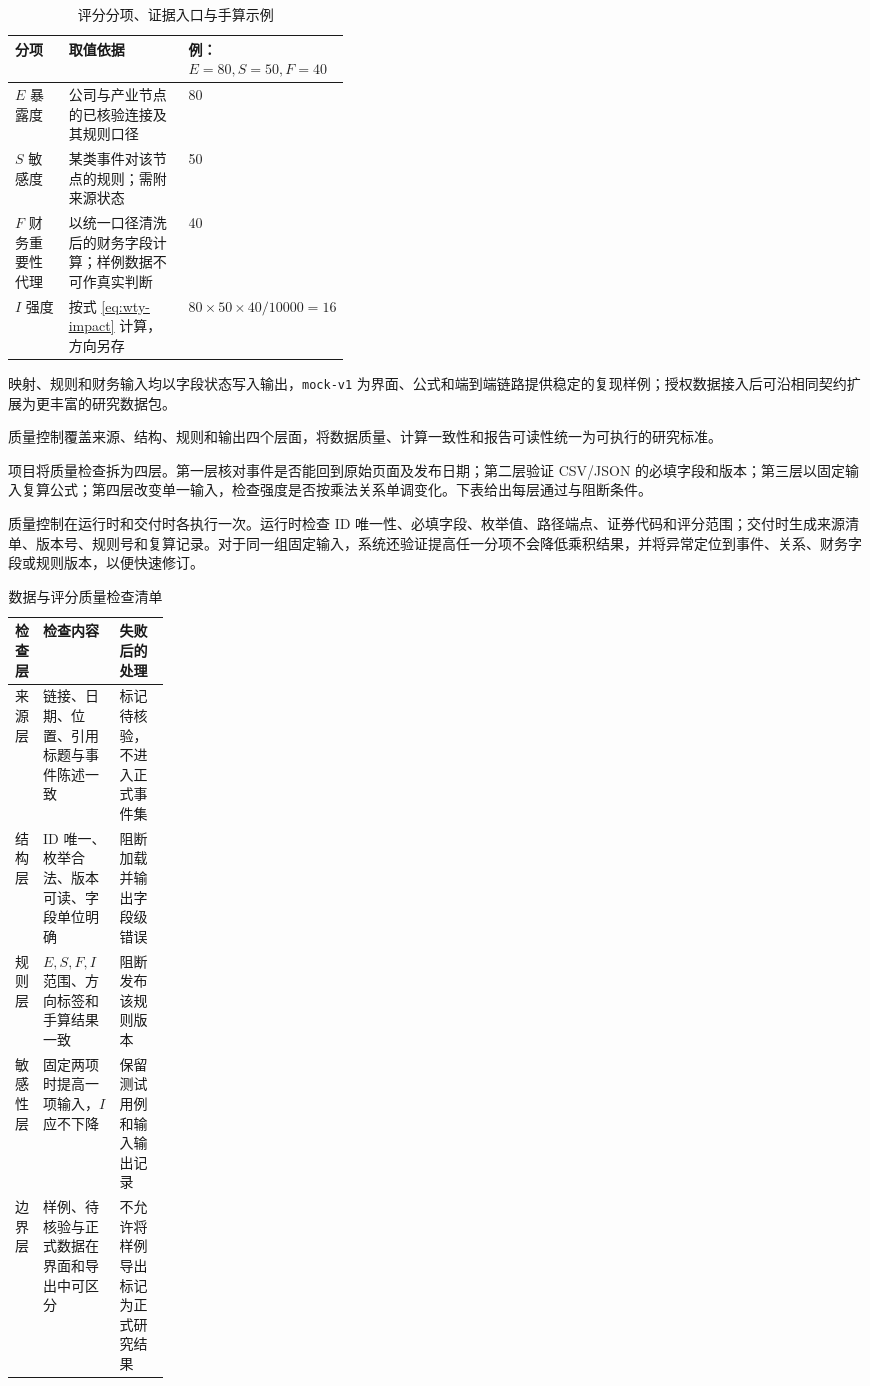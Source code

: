 \begin{table}[!htbp]
\centering
\caption{评分分项、证据入口与手算示例}
\label{tab:wty-impact-score}
\small
\begin{tabularx}{\linewidth}{p{0.16\linewidth}X p{0.23\linewidth}}
\toprule
分项 & 取值依据 & 例：$E=80,S=50,F=40$ \\
\midrule
$E$ 暴露度 & 公司与产业节点的已核验连接及其规则口径 & 80 \\
$S$ 敏感度 & 某类事件对该节点的规则；需附来源状态 & 50 \\
$F$ 财务重要性代理 & 以统一口径清洗后的财务字段计算；样例数据不可作真实判断 & 40 \\
$I$ 强度 & 按式 \ref{eq:wty-impact} 计算，方向另存 & $80\times50\times40/10000=16$ \\
\bottomrule
\end{tabularx}
\end{table}

映射、规则和财务输入均以字段状态写入输出，\texttt{mock-v1} 为界面、公式和端到端链路提供稳定的复现样例；授权数据接入后可沿相同契约扩展为更丰富的研究数据包。


质量控制覆盖来源、结构、规则和输出四个层面，将数据质量、计算一致性和报告可读性统一为可执行的研究标准。

项目将质量检查拆为四层。第一层核对事件是否能回到原始页面及发布日期；第二层验证 CSV/JSON 的必填字段和版本；第三层以固定输入复算公式；第四层改变单一输入，检查强度是否按乘法关系单调变化。下表给出每层通过与阻断条件。

质量控制在运行时和交付时各执行一次。运行时检查 ID 唯一性、必填字段、枚举值、路径端点、证券代码和评分范围；交付时生成来源清单、版本号、规则号和复算记录。对于同一组固定输入，系统还验证提高任一分项不会降低乘积结果，并将异常定位到事件、关系、财务字段或规则版本，以便快速修订。

\begin{table}[!htbp]
\centering
\caption{数据与评分质量检查清单}
\label{tab:wty-quality-check}
\small
\begin{tabularx}{\linewidth}{p{0.18\linewidth}X X}
\toprule
检查层 & 检查内容 & 失败后的处理 \\
\midrule
来源层 & 链接、日期、位置、引用标题与事件陈述一致 & 标记待核验，不进入正式事件集 \\
结构层 & ID 唯一、枚举合法、版本可读、字段单位明确 & 阻断加载并输出字段级错误 \\
规则层 & $E,S,F,I$ 范围、方向标签和手算结果一致 & 阻断发布该规则版本 \\
敏感性层 & 固定两项时提高一项输入，$I$ 应不下降 & 保留测试用例和输入输出记录 \\
边界层 & 样例、待核验与正式数据在界面和导出中可区分 & 不允许将样例导出标记为正式研究结果 \\
\bottomrule
\end{tabularx}
\end{table}

